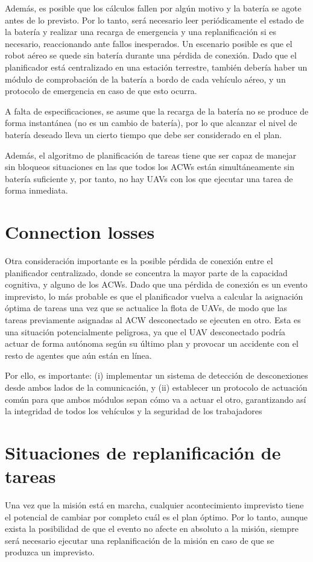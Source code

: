 \documentclass[fontsize=11pt, English=false, Español=true, Myfinal=true, twoside, numbers=noenddot]{scrbook}
\begin{document}
Además, es posible que los cálculos fallen por algún motivo y la batería se agote antes de lo previsto. Por lo tanto, será necesario leer periódicamente el estado de la batería y realizar una recarga de emergencia y una replanificación si es necesario, reaccionando ante fallos inesperados. Un escenario posible es que el robot aéreo se quede sin batería durante una pérdida de conexión. Dado que el planificador está centralizado en una estación terrestre, también debería haber un módulo de comprobación de la batería a bordo de cada vehículo aéreo, y un protocolo de emergencia en caso de que esto ocurra.

A falta de especificaciones, se asume que la recarga de la batería no se produce de forma instantánea (no es un cambio de batería), por lo que alcanzar el nivel de batería deseado lleva un cierto tiempo que debe ser considerado en el plan.

Además, el algoritmo de planificación de tareas tiene que ser capaz de manejar sin bloqueos situaciones en las que todos los \glspl{ACW} están simultáneamente sin batería suficiente y, por tanto, no hay \glspl{UAV} con los que ejecutar una tarea de forma inmediata.

\section{Connection losses}
\label{sec:ConnectionLosses}
Otra consideración importante es la posible pérdida de conexión entre el planificador centralizado, donde se concentra la mayor parte de la capacidad cognitiva, y alguno de los \glspl{ACW}. Dado que una pérdida de conexión es un evento imprevisto, lo más probable es que el planificador vuelva a calcular la asignación óptima de tareas una vez que se actualice la flota de \glspl{UAV}, de modo que las tareas previamente asignadas al \gls{ACW} desconectado se ejecuten en otro. Esta es una situación potencialmente peligrosa, ya que el \gls{UAV} desconectado podría actuar de forma autónoma según su último plan y provocar un accidente con el resto de agentes que aún están en línea.

Por ello, es importante: (i) implementar un sistema de detección de desconexiones desde ambos lados de la comunicación, y (ii) establecer un protocolo de actuación común para que ambos módulos sepan cómo va a actuar el otro, garantizando así la integridad de todos los vehículos y la seguridad de los trabajadores

\section{Situaciones de replanificación de tareas}
\label{sec:TaskReplanningSituations}
Una vez que la misión está en marcha, cualquier acontecimiento imprevisto tiene el potencial de cambiar por completo cuál es el plan óptimo. Por lo tanto, aunque exista la posibilidad de que el evento no afecte en absoluto a la misión, siempre será necesario ejecutar una replanificación de la misión en caso de que se produzca un imprevisto.
\end{document}
